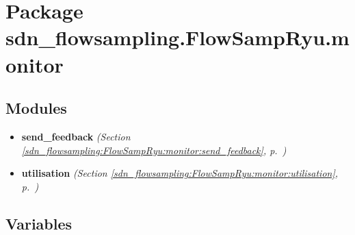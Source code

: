 %
%
%


\section{Package sdn\_flowsampling.FlowSampRyu.monitor}

    \label{sdn_flowsampling:FlowSampRyu:monitor}


\subsection{Modules}

\begin{itemize}
\setlength{\parskip}{0ex}
\item \textbf{send\_feedback}
  \textit{(Section \ref{sdn_flowsampling:FlowSampRyu:monitor:send_feedback}, p.~\pageref{sdn_flowsampling:FlowSampRyu:monitor:send_feedback})}

\item \textbf{utilisation}
  \textit{(Section \ref{sdn_flowsampling:FlowSampRyu:monitor:utilisation}, p.~\pageref{sdn_flowsampling:FlowSampRyu:monitor:utilisation})}

\end{itemize}



  \subsection{Variables}

